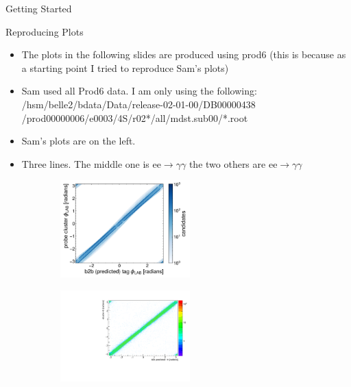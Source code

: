 \documentclass[10pt]{beamer}
\begin{document}
{\begin{frame}{Getting Started}
\begin{itemize}
\end{itemize}	
\end{frame}

\begin{frame}{Reproducing Plots}
	
	\begin{itemize}
		\item The plots in the following slides are produced using prod6 (this is because as a starting point I tried to reproduce Sam's plots)
		\item Sam used all Prod6 data. I am only using the following: /hsm/belle2/bdata/Data/release-02-01-00/DB00000438 /prod00000006/e0003/4S/r02*/all/mdst.sub00/*.root
		\item Sam's plots are on the left.	
		\item Three lines. The middle one is $\textrm{ee} \rightarrow \gamma \gamma$ the two others are $\textrm{ee} \rightarrow \gamma \gamma$
\end{itemize}
	
	
	\begin{figure}
		\centering
		\begin{subfigure}{.5\textwidth}
			\centering
			\includegraphics[width=5cm]{Plots/prodRecSam.jpeg}
			
			\label{fig:sub1}
		\end{subfigure}%
		\begin{subfigure}{.5\textwidth}
			\centering
			\includegraphics[width=5cm]{Plots/clusterb2b}
			
			\label{fig:sub2}
		\end{subfigure}
				
		\label{fig:test}
	\end{figure}
	
	
\end{frame}


}
\end{document}
